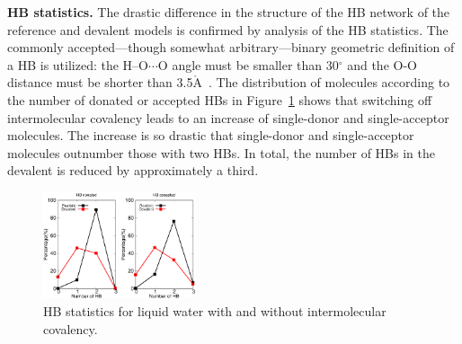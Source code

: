\documentclass[journal=jacsat,manuscript=article]{achemso}
\newcommand{\Ang}{\ensuremath{\mathring{\text{A}}}}
\begin{document}

 
\textbf{HB statistics.} The drastic difference in the structure of the HB network of the reference and devalent models is confirmed by analysis of the HB statistics. 
The commonly accepted---though somewhat arbitrary---binary geometric definition of a HB is utilized: the H--O$\cdots$O angle must be smaller than 30$^{\circ}$ and the O-O distance must be shorter than 3.5\Ang~\cite{rey2002hydrogen,lawrence2003vibrational}. 
The distribution of molecules according to the number of donated or accepted HBs in Figure~\ref{fig:HBstat} shows that switching off intermolecular covalency leads to an increase of single-donor and single-acceptor molecules. 
The increase is so drastic that single-donor and single-acceptor molecules outnumber those with two HBs.
In total, the number of HBs in the devalent is reduced by approximately a third.

\begin{figure}
\includegraphics[width=0.4\textwidth]{new_hbstat}
\caption{HB statistics for liquid water with and without intermolecular covalency.}\label{fig:HBstat}
\end{figure}
\end{document}
